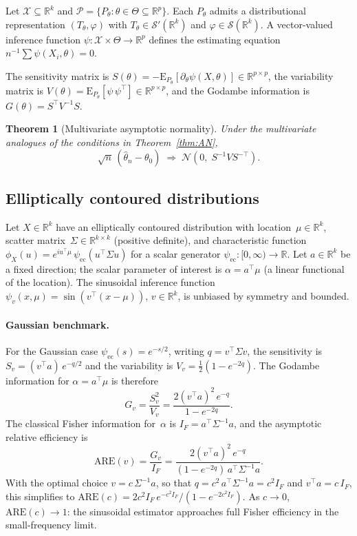 \documentclass[11pt,a4paper]{article}
\newtheorem{theorem}{Theorem}[section]
\newcommand{\E}{\mathrm{E}}
\newcommand{\R}{\mathbb{R}}
\begin{document}
Let $\mathcal X \subseteq \R^k$ and
$\mathcal P = \{P_\theta : \theta \in \Theta \subseteq \R^p\}$.  Each
$P_\theta$ admits a distributional representation
$(T_\theta, \varphi)$ with $T_\theta \in \mathcal S'(\R^k)$ and
$\varphi \in \mathcal S(\R^k)$.  A vector-valued inference function
$\psi : \mathcal X \times \Theta \to \R^p$ defines the estimating equation
$n^{-1}\sum \psi(X_i, \theta) = 0$.

The sensitivity matrix is
$S(\theta) = -\E_{P_\theta}[\partial_\theta \psi(X, \theta)]
\in \R^{p \times p}$,
the variability matrix is
$V(\theta) = \E_{P_\theta}[\psi\,\psi^\top] \in \R^{p \times p}$,
and the Godambe information is
$G(\theta) = S^\top V^{-1} S$.

\begin{theorem}[Multivariate asymptotic normality]\label{thm:multi-AN}
Under the multivariate analogues of the conditions in
Theorem~\ref{thm:AN},
\[
\sqrt{n}\,(\hat\theta_n - \theta_0)
\;\Rightarrow\;
\mathcal N\!\left(0,\; S^{-1} V S^{-\top}\right).
\]
\end{theorem}

\subsection{Elliptically contoured distributions}\label{subsec:elliptical}

Let $X \in \R^k$ have an elliptically contoured distribution with
location~$\mu \in \R^k$, scatter matrix~$\Sigma \in \R^{k \times k}$
(positive definite), and characteristic function
$\phi_X(u) = e^{iu^\top\mu}\,\psi_{\mathrm{ec}}(u^\top\Sigma u)$
for a scalar generator $\psi_{\mathrm{ec}} : [0,\infty) \to \R$.
Let $a \in \R^k$ be a fixed direction; the scalar parameter of interest is
$\alpha = a^\top\mu$ (a linear functional of the location).  The
sinusoidal inference function
$\psi_v(x, \mu) = \sin(v^\top(x - \mu))$, $v \in \R^k$, is unbiased by
symmetry and bounded.

\paragraph{Gaussian benchmark.}
For the Gaussian case $\psi_{\mathrm{ec}}(s) = e^{-s/2}$, writing
$q = v^\top\Sigma v$, the sensitivity is
$S_v = (v^\top a)\,e^{-q/2}$ and the variability is
$V_v = \frac{1}{2}(1 - e^{-2q})$.
The Godambe information for $\alpha = a^\top\mu$ is therefore
\[
G_v
= \frac{S_v^2}{V_v}
= \frac{2(v^\top a)^2\,e^{-q}}{1 - e^{-2q}}.
\]
The classical Fisher information for~$\alpha$ is
$I_F = a^\top\Sigma^{-1}a$, and the asymptotic relative efficiency is
\[
\mathrm{ARE}(v)
= \frac{G_v}{I_F}
= \frac{2(v^\top a)^2\,e^{-q}}{(1 - e^{-2q})\,a^\top\Sigma^{-1}a}.
\]
With the optimal choice $v = c\,\Sigma^{-1}a$, so that
$q = c^2\,a^\top\Sigma^{-1}a = c^2 I_F$ and $v^\top a = c\,I_F$, this
simplifies to
$\mathrm{ARE}(c) = 2c^2 I_F\,e^{-c^2 I_F}/(1 - e^{-2c^2 I_F})$.
As $c \to 0$, $\mathrm{ARE}(c) \to 1$: the sinusoidal estimator
approaches full Fisher efficiency in the small-frequency limit.
\end{document}
